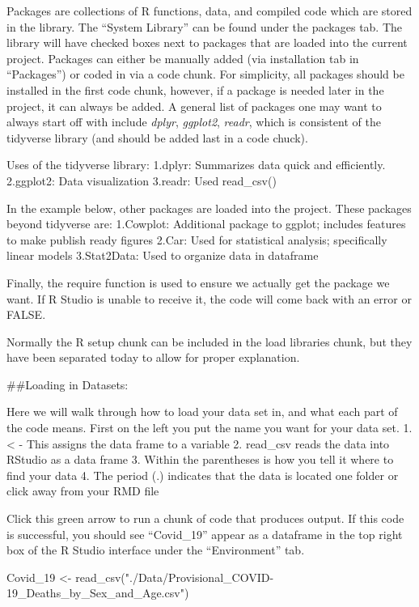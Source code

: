 \documentclass[
]{article}
\newenvironment{Shaded}{\begin{snugshade}}{\end{snugshade}}
\newcommand{\FunctionTok}[1]{\textcolor[rgb]{0.00,0.00,0.00}{#1}}
\newcommand{\NormalTok}[1]{#1}
\newcommand{\OtherTok}[1]{\textcolor[rgb]{0.56,0.35,0.01}{#1}}
\newcommand{\StringTok}[1]{\textcolor[rgb]{0.31,0.60,0.02}{#1}}
\begin{document}
Packages are collections of R functions, data, and compiled code which
are stored in the library. The ``System Library'' can be found under the
packages tab. The library will have checked boxes next to packages that
are loaded into the current project. Packages can either be manually
added (via installation tab in ``Packages'') or coded in via a code
chunk. For simplicity, all packages should be installed in the first
code chunk, however, if a package is needed later in the project, it can
always be added. A general list of packages one may want to always start
off with include \emph{dplyr}, \emph{ggplot2}, \emph{readr}, which is
consistent of the tidyverse library (and should be added last in a code
chuck).

Uses of the tidyverse library: 1.dplyr: Summarizes data quick and
efficiently. 2.ggplot2: Data visualization 3.readr: Used read\_csv()

In the example below, other packages are loaded into the project. These
packages beyond tidyverse are: 1.Cowplot: Additional package to ggplot;
includes features to make publish ready figures 2.Car: Used for
statistical analysis; specifically linear models 3.Stat2Data: Used to
organize data in dataframe

Finally, the require function is used to ensure we actually get the
package we want. If R Studio is unable to receive it, the code will come
back with an error or FALSE.

Normally the R setup chunk can be included in the load libraries chunk,
but they have been separated today to allow for proper explanation.

\#\#Loading in Datasets:

Here we will walk through how to load your data set in, and what each
part of the code means. First on the left you put the name you want for
your data set. 1. \textless{} - This assigns the data frame to a
variable 2. read\_csv reads the data into RStudio as a data frame 3.
Within the parentheses is how you tell it where to find your data 4. The
period (.) indicates that the data is located one folder or click away
from your RMD file

Click this green arrow to run a chunk of code that produces output. If
this code is successful, you should see ``Covid\_19'' appear as a
dataframe in the top right box of the R Studio interface under the
``Environment'' tab.

\begin{Shaded}
\begin{Highlighting}[]
\NormalTok{Covid\_19 }\OtherTok{\textless{}{-}} \FunctionTok{read\_csv}\NormalTok{(}\StringTok{"./Data/Provisional\_COVID{-}19\_Deaths\_by\_Sex\_and\_Age.csv"}\NormalTok{)}
\end{Highlighting}
\end{Shaded}
\end{document}
